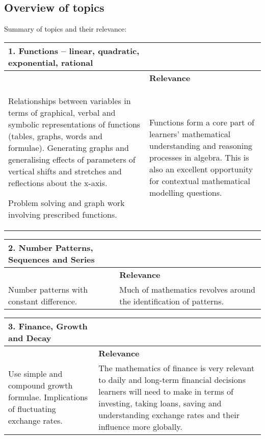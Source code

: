 \subsection{Overview of topics}
Summary of topics and their relevance:

\begin{table}[H]
\begin{center} 
\begin{tabular}{|p{8.5cm}|p{3.5cm}|} \hline
\textbf{1. Functions – linear, quadratic, exponential, rational} & \\ \hline  
&  \textbf{Relevance} \\ \hline
Relationships between variables in terms of graphical, verbal and symbolic representations of functions (tables, graphs, words and formulae). Generating graphs and generalising effects of parameters of vertical shifts and stretches and reflections about the x-axis.\par
Problem solving and graph work involving prescribed functions.& Functions form a core part of learners’ mathematical understanding and reasoning processes in algebra. This is also an excellent opportunity for contextual mathematical modelling questions. \\ \hline

 \end{tabular}
\end{center}
\end{table}

\begin{table}[H]
\begin{center} 
\begin{tabular}{|p{8.5cm}|p{3.5cm}|} \hline
\textbf{2. Number Patterns, Sequences and Series}& \\ \hline  
&  \textbf{Relevance} \\ \hline
Number patterns with constant difference.& Much of mathematics revolves around the identification of patterns.
\\ \hline

 \end{tabular}
\end{center}
\end{table}

\begin{table}[H]
\begin{center} 
\begin{tabular}{|p{8.5cm}|p{3.5cm}|} \hline
\textbf{3. Finance, Growth and Decay}& \\ \hline  
&  \textbf{Relevance} \\ \hline
Use simple and compound growth formulae. Implications of fluctuating exchange rates.& The mathematics of finance is very relevant to daily and long-term financial decisions learners will need to make in terms of investing, taking loans, saving and understanding exchange rates and their influence more globally.
\\ \hline

 \end{tabular}
\end{center}
\end{table}

